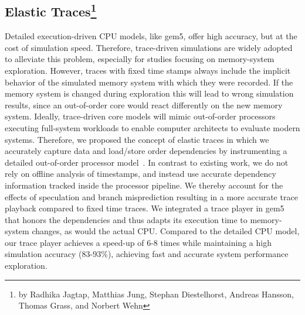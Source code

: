 \subsection[Elastic Traces]{Elastic Traces\footnote{by Radhika Jagtap, Matthias Jung, Stephan Diestelhorst, Andreas Hansson, Thomas Grass, and Norbert Wehn}}
%
Detailed execution-driven CPU models, like gem5, offer high accuracy, but at the cost of simulation speed.
Therefore, trace-driven simulations are widely adopted to alleviate this problem, especially for studies focusing on memory-system exploration.
However, traces with fixed time stamps always include the implicit behavior of the simulated memory system with which they were recorded.
If the memory system is changed during exploration this will lead to wrong simulation results, since an out-of-order core would react differently on the new memory system.
Ideally, trace-driven core models will mimic out-of-order processors executing full-system workloads to enable computer architects to evaluate modern systems.
Therefore, we proposed the concept of elastic traces in which we accurately capture data and load/store order dependencies by instrumenting a detailed out-of-order processor model~\cite{jagdie_16}.
In contrast to existing work, we do not rely on offline analysis of timestamps, and instead use accurate dependency information tracked inside the processor pipeline.
We thereby account for the effects of speculation and branch misprediction resulting in a more accurate trace playback compared to fixed time traces.
We integrated a trace player in gem5 that honors the dependencies and thus adapts its execution time to memory-system changes, as would the actual CPU. Compared to the detailed CPU model, our trace player achieves a speed-up of 6-8 times while maintaining a high simulation accuracy (83-93\%), achieving fast and accurate system performance exploration.

